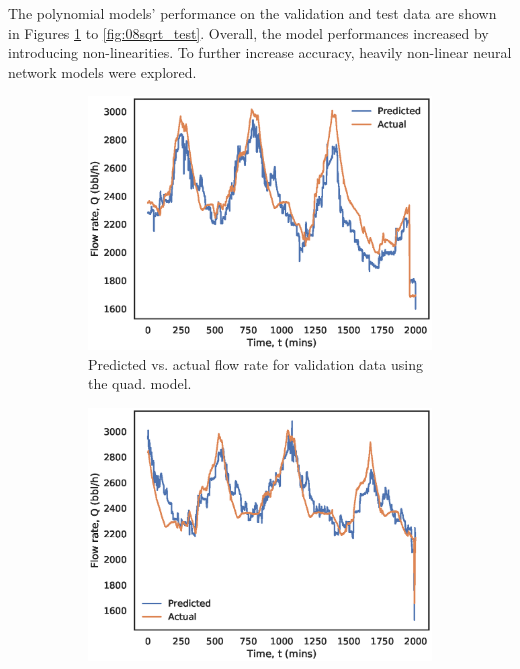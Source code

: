 The polynomial models' performance on the validation and test data are shown in Figures \ref{fig:08quad_validation} to \ref{fig:08sqrt_test}.  Overall, the model performances increased by introducing non-linearities. To further increase accuracy, heavily non-linear neural network models were explored.

\begin{figure}[h]
     \centering
     \begin{subfigure}[b]{0.45\textwidth}
         \centering
         \includegraphics[width=\textwidth]{images/suncor/08quad_validation.eps}
         \caption{Predicted vs. actual flow rate for validation data using the quad. model.}
         \label{fig:08quad_validation}
     \end{subfigure}
     \begin{subfigure}[b]{0.45\textwidth}
         \centering
         \includegraphics[width=\textwidth]{images/suncor/08quad_test.eps}

\end{subfigure}
\end{figure}
